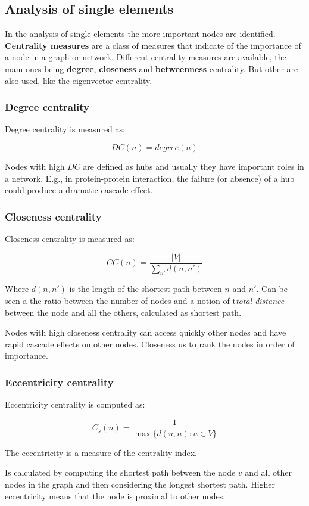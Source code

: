 	\subsection{Analysis of single elements}
	In the analysis of single elements the more important nodes are identified.
	\textbf{Centrality measures} are a class of measures that indicate of the importance of a node in a graph or network.
	Different centrality measures are available, the main ones being \textbf{degree}, \textbf{closeness} and \textbf{betweenness} centrality.
	But other are also used, like the eigenvector centrality.

		\subsubsection{Degree centrality}
		Degree centrality is measured as:

		$$DC(n) = degree(n)$$

		Nodes with high $DC$ are defined as hubs and usually they have important roles in a network.
E.g., in protein-protein interaction, the failure (or absence) of a hub could produce a dramatic cascade effect. 

		\subsubsection{Closeness centrality}
		Closeness centrality is measured as:

		$$CC(n) = \frac{|V|}{\sum\limits_{n'}d(n,n')}$$
		
		Where $d(n,n')$ is the length of the shortest path between $n$ and $n'$.
		Can be seen a the ratio between the number of nodes and a notion of t\textit{total distance} between the node and all the others, calculated as shortest path. 

		Nodes with high closeness centrality can access quickly other nodes and have rapid cascade effects on other nodes.
		Closeness us to rank the nodes in order of importance. 

		\subsubsection{Eccentricity centrality}
		Eccentricity centrality is computed as:

		$$C_s(n) = \frac{1}{\max\{d(u,n):u\in V\}}$$

		The eccentricity is a measure of the centrality index.
		
		Is calculated by computing the shortest path between the node $v$ and all other nodes in the graph and then considering the longest shortest path.
		Higher eccentricity means that the node is proximal to other nodes.

